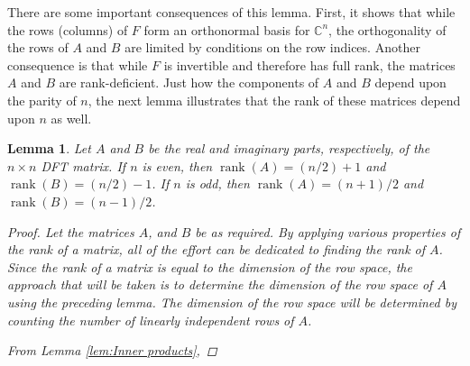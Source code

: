 \documentclass[12pt]{article}
\newcommand{\rank}{\operatorname{rank}}	%
\newtheorem{lemma}{Lemma}[section]
\begin{document}
There are some important consequences of this lemma. First, it shows that while the rows (columns) of $F$ form an orthonormal basis for $\mathbb{C}^n$, the orthogonality of the rows of $A$ and $B$ are limited by conditions on the row indices. Another consequence is that while $F$ is invertible and therefore has full rank, the matrices $A$ and $B$ are rank-deficient. Just how the components of $A$ and $B$ depend upon the parity of $n$, the next lemma illustrates that the rank of these matrices depend upon $n$ as well.

\begin{lemma}
\label{lem:Rank of A and B}
Let $A$ and $B$ be the real and imaginary parts, respectively, of the $n \times n$ DFT matrix. If $n$ is even, then $\rank(A) = (n/2)+1$ and $\rank(B) = (n/2)-1$. If $n$ is odd, then $\rank(A) = (n+1)/2$ and $\rank(B) = (n-1)/2$. 
\begin{proof}
Let the matrices $A$, and $B$ be as required. By applying various properties of the rank of a matrix, all of the effort can be dedicated to finding the rank of $A$. Since the rank of a matrix is equal to the dimension of the row space, the approach that will be taken is to determine the dimension of the row space of $A$ using the preceding lemma. The dimension of the row space will be determined by counting the number of linearly independent rows of $A$. \par 
From Lemma \ref{lem:Inner products},



\end{proof}
\end{lemma}
\end{document}
